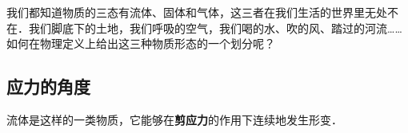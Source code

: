 
我们都知道物质的三态有流体、固体和气体，这三者在我们生活的世界里无处不在．我们脚底下的土地，我们呼吸的空气，我们喝的水、吹的风、踏过的河流…… 如何在物理定义上给出这三种物质形态的一个划分呢？

\subsection{应力的角度}
流体是这样的一类物质，它能够在\textbf{剪应力}的作用下连续地发生形变．